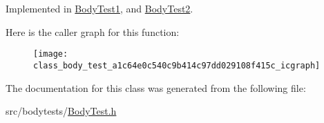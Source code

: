Implemented in \hyperlink{class_body_test1_ae86e4f3f8d140b4673e422a57770755e}{Body\+Test1}, and \hyperlink{class_body_test2_ab496f4a4caecc90776893cb2729b8ef4}{Body\+Test2}.



Here is the caller graph for this function\+:
\nopagebreak
\begin{figure}[H]
\begin{center}
\leavevmode
\texttt{[image: class\_body\_test\_a1c64e0c540c9b414c97dd029108f415c\_icgraph]}
\end{center}
\end{figure}




The documentation for this class was generated from the following file\+:\begin{DoxyCompactItemize}
\item 
src/bodytests/\hyperlink{_body_test_8h}{Body\+Test.\+h}\end{DoxyCompactItemize}
